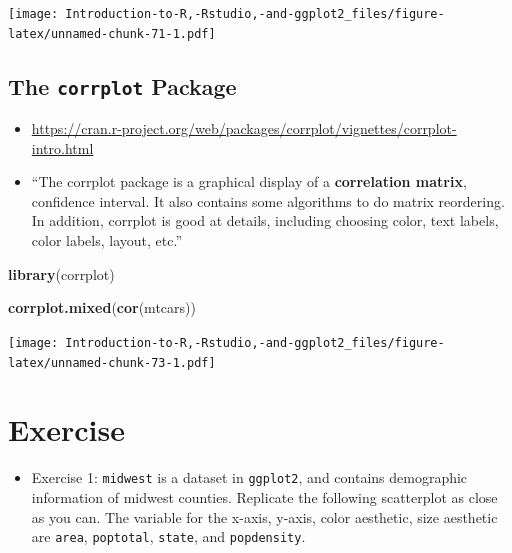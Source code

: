 \documentclass[]{book}
\newenvironment{Shaded}{\begin{snugshade}}{\end{snugshade}}
\newcommand{\KeywordTok}[1]{\textcolor[rgb]{0.13,0.29,0.53}{\textbf{{#1}}}}
\newcommand{\NormalTok}[1]{{#1}}
\providecommand{\tightlist}{%
  \setlength{\itemsep}{0pt}\setlength{\parskip}{0pt}}
\begin{document}
\texttt{[image: Introduction-to-R,-Rstudio,-and-ggplot2\_files/figure-latex/unnamed-chunk-71-1.pdf]}

\section{\texorpdfstring{The \texttt{corrplot}
Package}{The corrplot Package}}\label{the-corrplot-package}

\begin{itemize}
\tightlist
\item
  \url{https://cran.r-project.org/web/packages/corrplot/vignettes/corrplot-intro.html}
\item
  ``The corrplot package is a graphical display of a \textbf{correlation
  matrix}, confidence interval. It also contains some algorithms to do
  matrix reordering. In addition, corrplot is good at details, including
  choosing color, text labels, color labels, layout, etc.''
\end{itemize}

\begin{Shaded}
\begin{Highlighting}[]
\KeywordTok{library}\NormalTok{(corrplot)}
\end{Highlighting}
\end{Shaded}

\begin{Shaded}
\begin{Highlighting}[]
\KeywordTok{corrplot.mixed}\NormalTok{(}\KeywordTok{cor}\NormalTok{(mtcars))}
\end{Highlighting}
\end{Shaded}

\texttt{[image: Introduction-to-R,-Rstudio,-and-ggplot2\_files/figure-latex/unnamed-chunk-73-1.pdf]}

\chapter{Exercise}\label{exercise-3}

\begin{itemize}
\tightlist
\item
  Exercise 1: \texttt{midwest} is a dataset in \texttt{ggplot2}, and
  contains demographic information of midwest counties. Replicate the
  following scatterplot as close as you can. The variable for the
  x-axis, y-axis, color aesthetic, size aesthetic are \texttt{area},
  \texttt{poptotal}, \texttt{state}, and \texttt{popdensity}.
\end{itemize}
\end{document}
